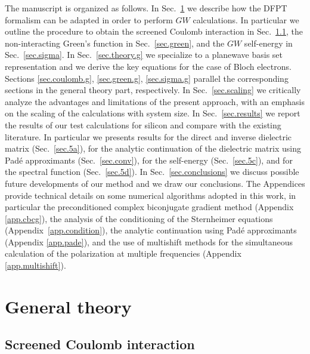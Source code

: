 \documentclass[twocolumn,prb,showpacs,superscriptaddress]{revtex4}
\begin{document}
The manuscript is organized as follows. In Sec.\ \ref{sec.theory} we describe
how the DFPT formalism can be adapted in order to perform $GW$ calculations.
In particular we outline the procedure to obtain the screened Coulomb
interaction in Sec.\ \ref{sec.coulomb}, the non-interacting Green's function
in Sec.\ \ref{sec.green}, and the $GW$ self-energy in Sec.\ \ref{sec.sigma}.
In Sec.\ \ref{sec.theory.g} we specialize to a planewave basis set representation
and we derive the key equations for the case of Bloch electrons.
Sections \ref{sec.coulomb.g}, \ref{sec.green.g}, \ref{sec.sigma.g}
parallel the corresponding sections in the general theory part, respectively.
In Sec.\ \ref{sec.scaling} we critically analyze the advantages 
and limitations of the present approach, with an emphasis on the
scaling of the calculations with system size. 
In Sec.\ \ref{sec.results} we report the results of our test calculations
for silicon and compare with the existing literature. In particular
we presents results for the direct and inverse dielectric matrix (Sec.\ \ref{sec.5a}),
for the analytic continuation of the dielectric matrix using Pad\'e approximants
(Sec.\ \ref{sec.conv}), for the self-energy (Sec.\ \ref{sec.5c}), 
and for the spectral function (Sec.\ \ref{sec.5d}).
In Sec.~\ref{sec.conclusions} we discuss possible
future developments of our method and we draw our conclusions.
The Appendices provide technical details on some numerical algorithms adopted
in this work, in particular the preconditioned complex biconjugate gradient method (Appendix \ref{app.cbcg}),
the analysis of the conditioning of the Sternheimer equations (Appendix~\ref{app.condition}),
the analytic continuation using Pad\'e approximants (Appendix \ref{app.pade}),
and the use of multishift methods for the simultaneous calculation of 
the polarization at multiple frequencies (Appendix \ref{app.multishift}).

\section{General theory}\label{sec.theory}

\subsection{Screened Coulomb interaction}\label{sec.coulomb}
\end{document}
